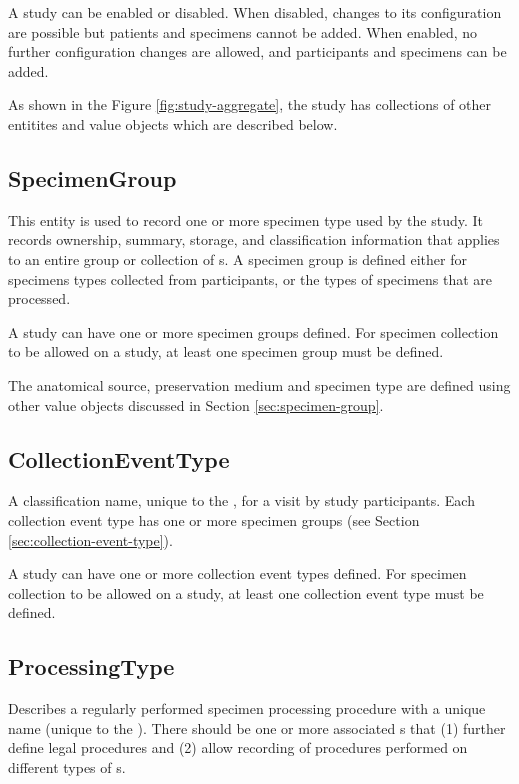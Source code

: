 A study can be enabled or disabled. When disabled, changes to its configuration
are possible but patients and specimens cannot be added. When enabled, no
further configuration changes are allowed, and participants and specimens can
be added.

As shown in the Figure \ref{fig:study-aggregate}, the study has collections of
other entitites and value objects which are described below.

\subsection*{SpecimenGroup}

This entity is used to record one or more specimen type used by the study.  It
records ownership, summary, storage, and classification information that
applies to an entire group or collection of s. A specimen
group is defined either for specimens types collected from participants, or the
types of specimens that are processed.

A study can have one or more specimen groups defined.  For specimen collection
to be allowed on a study, at least one specimen group must be defined.

The anatomical source, preservation medium and specimen type are defined using
other value objects discussed in Section \ref{sec:specimen-group}.

\subsection*{CollectionEventType}

A classification name, unique to the , for a visit by study
participants. Each collection event type has one or more specimen groups (see
Section \ref{sec:collection-event-type}).

A study can have one or more collection event types defined. For specimen
collection to be allowed on a study, at least one collection event type must be
defined.

\subsection*{ProcessingType}

Describes a regularly performed specimen processing procedure with a unique
name (unique to the ). There should be one or more associated
s that (1) further define legal procedures and (2)
allow recording of procedures performed on different types of
s.

